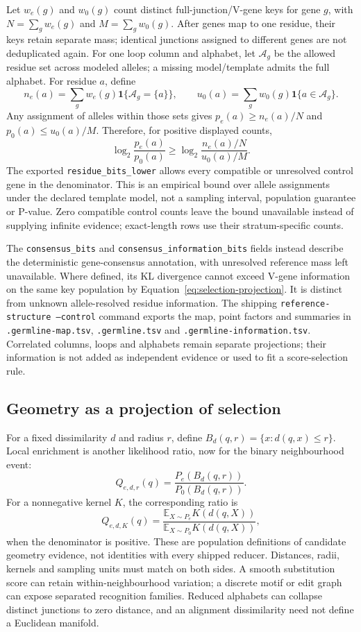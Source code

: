 \documentclass[10pt,a4paper]{article}
\theoremstyle{definition}
\begin{document}
Let $w_e(g)$ and $w_0(g)$ count distinct full-junction/V-gene keys for gene $g$, with $N=\sum_gw_e(g)$ and $M=\sum_gw_0(g)$.
After genes map to one residue, their keys retain separate mass; identical junctions assigned to different genes are not deduplicated again.
For one loop column and alphabet, let $\mathcal A_g$ be the allowed residue set across modeled alleles; a missing model/template admits the full alphabet.
For residue $a$, define
\begin{equation}
 n_e(a)=\sum_gw_e(g)\mathbf1\{\mathcal A_g=\{a\}\},\qquad
 u_0(a)=\sum_gw_0(g)\mathbf1\{a\in\mathcal A_g\}.
\end{equation}
Any assignment of alleles within those sets gives $p_e(a)\ge n_e(a)/N$ and $p_0(a)\le u_0(a)/M$.
Therefore, for positive displayed counts,
\begin{equation}
 \log_2\frac{p_e(a)}{p_0(a)}
 \ge \log_2\frac{n_e(a)/N}{u_0(a)/M}.
 \label{eq:germline-residue-bound}
\end{equation}
The exported \texttt{residue\_bits\_lower} allows every compatible or unresolved control gene in the denominator.
This is an empirical bound over allele assignments under the declared template model, not a sampling interval, population guarantee or P-value.
Zero compatible control counts leave the bound unavailable instead of supplying infinite evidence; exact-length rows use their stratum-specific counts.

The \texttt{consensus\_bits} and \texttt{consensus\_information\_bits} fields instead describe the deterministic gene-consensus annotation, with unresolved reference mass left unavailable.
Where defined, its KL divergence cannot exceed V-gene information on the same key population by Equation~\eqref{eq:selection-projection}.
It is distinct from unknown allele-resolved residue information.
The shipping \texttt{reference-structure --control} command exports the map, point factors and summaries in \texttt{.germline-map.tsv}, \texttt{.germline.tsv} and \texttt{.germline-information.tsv}.
Correlated columns, loops and alphabets remain separate projections; their information is not added as independent evidence or used to fit a score-selection rule.

\subsection{Geometry as a projection of selection}
For a fixed dissimilarity $d$ and radius $r$, define $B_d(q,r)=\{x:d(q,x)\le r\}$.
Local enrichment is another likelihood ratio, now for the binary neighbourhood event:
\[
 Q_{e,d,r}(q)=\frac{P_e(B_d(q,r))}{P_0(B_d(q,r))}.
\]
For a nonnegative kernel $K$, the corresponding ratio is
\[
 Q_{e,d,K}(q)=
 \frac{\mathbb E_{X\sim P_e}K(d(q,X))}
      {\mathbb E_{X\sim P_0}K(d(q,X))},
\]
when the denominator is positive.
These are population definitions of candidate geometry evidence, not identities with every shipped reducer.
Distances, radii, kernels and sampling units must match on both sides.
A smooth substitution score can retain within-neighbourhood variation; a discrete motif or edit graph can expose separated recognition families.
Reduced alphabets can collapse distinct junctions to zero distance, and an alignment dissimilarity need not define a Euclidean manifold.
\end{document}
